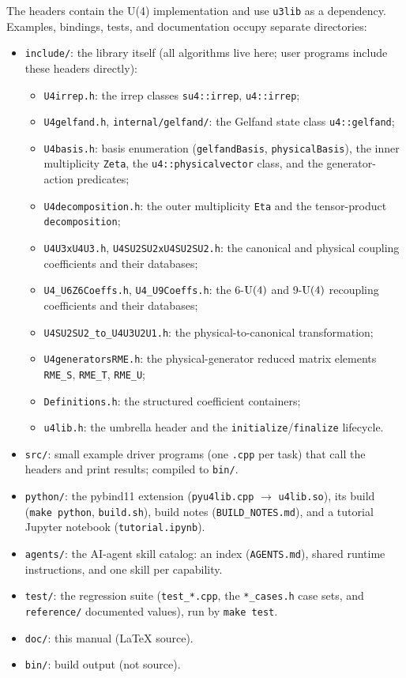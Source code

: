 \documentclass[aps,onecolumn,10pt,superscriptaddress,floatfix,nofootinbib]{revtex4}
\begin{document}
The headers contain the U(4) implementation and use \texttt{u3lib} as a
dependency. Examples, bindings, tests, and documentation occupy separate
directories:
\begin{itemize}
    \item \verb|include/|: the library itself (all algorithms live here; user
    programs include these headers directly):
    \begin{itemize}
        \item \verb|U4irrep.h|: the irrep classes \verb|su4::irrep|, \verb|u4::irrep|;
        \item \verb|U4gelfand.h|, \verb|internal/gelfand/|: the Gelfand state class \verb|u4::gelfand|;
        \item \verb|U4basis.h|: basis enumeration (\verb|gelfandBasis|, \verb|physicalBasis|), the inner multiplicity \verb|Zeta|, the \verb|u4::physicalvector| class, and the generator-action predicates;
        \item \verb|U4decomposition.h|: the outer multiplicity \verb|Eta| and the tensor-product \verb|decomposition|;
        \item \verb|U4U3xU4U3.h|, \verb|U4SU2SU2xU4SU2SU2.h|: the canonical and physical coupling coefficients and their databases;
        \item \verb|U4_U6Z6Coeffs.h|, \verb|U4_U9Coeffs.h|: the 6-$\rm U(4)$ and 9-$\rm U(4)$ recoupling coefficients and their databases;
        \item \verb|U4SU2SU2_to_U4U3U2U1.h|: the physical-to-canonical transformation;
        \item \verb|U4generatorsRME.h|: the physical-generator reduced matrix elements \verb|RME_S|, \verb|RME_T|, \verb|RME_U|;
        \item \verb|Definitions.h|: the structured coefficient containers;
        \item \verb|u4lib.h|: the umbrella header and the \verb|initialize|/\verb|finalize| lifecycle.
    \end{itemize}
    \item \verb|src/|: small example driver programs (one \verb|.cpp| per task) that call the headers and print results; compiled to \verb|bin/|.
    \item \verb|python/|: the pybind11 extension (\verb|pyu4lib.cpp| $\to$ \verb|u4lib.so|), its build (\verb|make python|, \verb|build.sh|), build notes (\verb|BUILD_NOTES.md|), and a tutorial Jupyter notebook (\verb|tutorial.ipynb|).
    \item \verb|agents/|: the AI-agent skill catalog: an index (\verb|AGENTS.md|), shared runtime instructions, and one skill per capability.
    \item \verb|test/|: the regression suite (\verb|test_*.cpp|, the \verb|*_cases.h| case sets, and \verb|reference/| documented values), run by \verb|make test|.
    \item \verb|doc/|: this manual (LaTeX source).
    \item \verb|bin/|: build output (not source).
\end{itemize}
\end{document}
